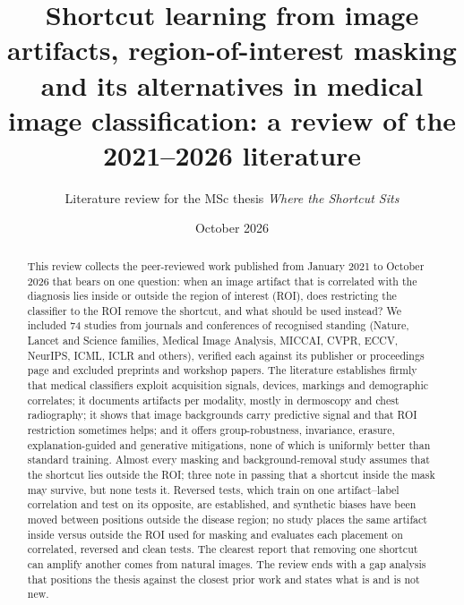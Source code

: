 \documentclass[11pt,a4paper]{article}
\title{Shortcut learning from image artifacts, region-of-interest masking and its alternatives in medical image
classification: a review of the 2021--2026 literature}
\author{Literature review for the MSc thesis \emph{Where the Shortcut Sits}}
\date{October 2026}
\begin{document}
\maketitle

\begin{abstract}
\noindent This review collects the peer-reviewed work published from January 2021 to October 2026 that bears on one
question: when an image artifact that is correlated with the diagnosis lies inside or outside the region of interest
(ROI), does restricting the classifier to the ROI remove the shortcut, and what should be used instead? We included
74 studies from journals and conferences of recognised standing (Nature, Lancet and Science families, Medical Image
Analysis, MICCAI, CVPR, ECCV, NeurIPS, ICML, ICLR and others), verified each against its publisher or proceedings page
and excluded preprints and workshop papers. The literature establishes firmly that medical classifiers exploit
acquisition signals, devices, markings and demographic correlates; it documents artifacts per modality, mostly in
dermoscopy and chest radiography; it shows that image backgrounds carry predictive signal and that ROI restriction
sometimes helps; and it offers group-robustness, invariance, erasure, explanation-guided and generative mitigations,
none of which is uniformly better than standard training. Almost every masking and background-removal study assumes
that the shortcut lies outside the ROI; three note in passing that a shortcut inside the mask may survive, but none
tests it. Reversed tests, which train on one artifact--label correlation and test on
its opposite, are established, and synthetic biases have been moved between positions outside the disease region; no
study places the same artifact inside versus outside the ROI used for masking and evaluates each placement on
correlated, reversed and clean tests. The clearest report that removing one shortcut can amplify another comes from natural images. The review ends
with a gap analysis that positions the thesis against the closest prior work and states what is and is not new.
\end{abstract}

\tableofcontents

\end{document}
